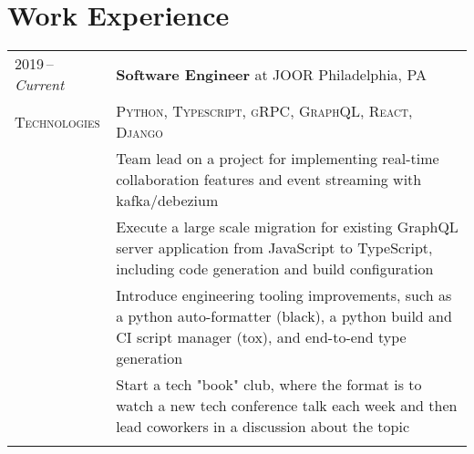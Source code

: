 \documentclass[a4paper,12pt]{article}
\begin{document}
\section{Work Experience}
\begin{tabularx}{\textwidth}{@{\extracolsep{2pt}}p{6em}|X@{}}
    2019\,--\,\emph{Current} & \textbf{Software Engineer} at \textsc{JOOR} \hfill Philadelphia, PA                                                                                                           \\
    \textsc{Technologies}    & \textsc{Python}, \textsc{Typescript}, \textsc{gRPC}, \textsc{GraphQL}, \textsc{React}, \textsc{Django}                                                                        \\
                             & \footnotesize Team lead on a project for implementing real-time collaboration features and event streaming with kafka/debezium                                                \\
                             & \footnotesize Execute a large scale migration for existing GraphQL server application from JavaScript to TypeScript, including code generation and build configuration        \\
                             & \footnotesize Introduce engineering tooling improvements, such as a python auto-formatter (black), a python build and CI script manager (tox), and end-to-end type generation \\
                             & \footnotesize Start a tech "book" club, where the format is to watch a new tech conference talk each week and then lead coworkers in a discussion about the topic             \\

    \multicolumn{2}{c}{}                                                                                                                                                                                     \\


\end{tabularx}
\end{document}
